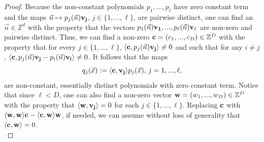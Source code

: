 \documentclass[11pt,american,preprint]{elsarticle}
\numberwithin{equation}{section}
\theoremstyle{plain}
\theoremstyle{plain*}
\theoremstyle{plain}
\theoremstyle{plain*}
\theoremstyle{plain}
\theoremstyle{plain*}
\theoremstyle{remark}
\theoremstyle{remark*}
\theoremstyle{remark}
\theoremstyle{remark*}
\theoremstyle{remark}
\theoremstyle{remark*}
\theoremstyle{plain}
\theoremstyle{definition}
\theoremstyle{plain}
\theoremstyle{plain} %
\newcommand{\Z}{\mathbb{Z}}
\begin{document}
\begin{proof}
Because the non-constant polynomials $p_1,...,p_\ell$ have zero constant term and the maps $\vec n\mapsto p_j(\vec n){\bf v_j}$, $j\in\{1,...,\ell\}$, are pairwise distinct, one can find an $\vec n\in \Z^d$ with the property  that the vectors $p_1(\vec n){\bf v_1},...,p_\ell(\vec n){\bf v_\ell}$ are non-zero and pairwise distinct. 
Thus, we can find a non-zero ${\bf c}=(c_1,...,c_D)\in \Z^D$ with the property that for every $j\in\{1,...,\ell\}$,
    $\langle {\bf c},p_j(\vec n){\bf v_j}\rangle\neq 0$ and such that for any $i\neq j$,  $\langle {\bf c},p_j(\vec n){\bf v_j}-p_i(\vec n){\bf v_i}\rangle\neq 0$. 
    It follows that the maps
    \begin{equation}\label{9.eq:Defnq_j}
    q_j(\vec x):=\langle {\bf c},{\bf v_j}\rangle p_j(\vec x),\,j=1,...,\ell,
    \end{equation}
    are non-constant, essentially distinct polynomials with zero constant term. Notice that since $\ell<D$, one can also find a non-zero vector ${\bf w}=(w_1,...,w_D)\in \Z^D$ with the property that $\langle {\bf w},{\bf v_j}\rangle=0$ for each $j\in\{1,...,\ell\}$.
    Replacing ${\bf c}$ with $\langle {\bf w},{\bf w}\rangle{\bf c}-\langle {\bf c},{\bf w}\rangle {\bf w}$, if needed, we can assume  without loss of generality that  $\langle {\bf c},{\bf w}\rangle=0$.\\
    

\end{proof}
\end{document}
